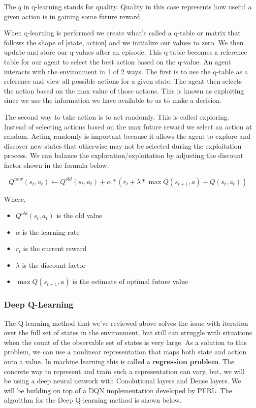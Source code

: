 \documentclass[conference]{IEEEtran}
\begin{document}
The $q$ in q-learning stands for quality. Quality in this case represents how useful a given action is in gaining some future reward.

When q-learning is performed we create what's called a q-table or matrix that follows the shape of [state, action] and we initialize our values to zero. We then update and store our q-values after an episode. This q-table becomes a reference table for our agent to select the best action based on the q-value. An agent interacts with the environment in 1 of 2 ways. The first is to use the q-table as a reference and view all possible actions for a given state. 
The agent then selects the action based on the max value of those actions. This is known as exploiting since we use the information we have available to us to make a decision.

The second way to take action is to act randomly. This is called exploring. Instead of selecting actions based on the max future reward we select an action at random. Acting randomly is important because it allows the agent to explore and discover new states that otherwise may not be selected during the exploitation process. We can balance the exploration/exploitation by adjusting the discount factor shown in the formula below:

\begin{equation}
    {Q}^{new}(s_{t}, a_{t}) \leftarrow {Q}^{old}(s_{t}, a_{t}) + \alpha * (r_{t} + \lambda*\max Q(s_{t+1}, a) - Q(s_{t}, a_{t}))
\end{equation}

Where, 
\begin{itemize}
    \item ${Q}^{old}(s_{t}, a_{t})$ is the old value
    \item $\alpha$ is the learning rate
    \item $r_{t}$ is the current reward
    \item $\lambda$ is the discount factor
    \item $\max Q(s_{t+1}, a)$ is the estimate of optimal future value
\end{itemize}

\subsubsection{Deep Q-Learning}
The Q-learning method that we've reviewed above solves the issue with iteration over the full set of states in the environment, but still can struggle with situations when the count of the observable set of states is very large. As a solution to this problem, we can use a nonlinear representation that maps both state and action onto a value. In machine learning this is called a \textbf{regression problem}. The concrete way to represent and train such a representation can vary, 
but, we will be using a deep neural network with Conolutional layers and Dense layers. We will be building on top of a DQN implementation developed by PFRL\cite{JMLR:v22:20-376}.
The algorithm for the Deep Q-learning method is shown below.
\end{document}
